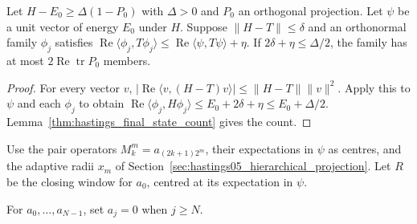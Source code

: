 \begin{lemma}
    \label{thm:hastings05_physical_gap_count}
    \leanok
    Let $H-E_0\ge\Delta(1-P_0)$ with $\Delta>0$ and $P_0$ an orthogonal
    projection. Let $\psi$ be a unit vector of energy $E_0$ under $H$.
    Suppose $\|H-T\|\le\delta$ and an orthonormal family $\phi_j$ satisfies
    $\operatorname{Re}\langle\phi_j,T\phi_j\rangle
        \le\operatorname{Re}\langle\psi,T\psi\rangle+\eta$.
    If $2\delta+\eta\le\Delta/2$, the family has at most
    $2\operatorname{Re}\operatorname{tr}P_0$ members.
\end{lemma}
\begin{proof}\leanok
    For every vector $v$,
    $|\operatorname{Re}\langle v,(H-T)v\rangle|
        \le\|H-T\|\|v\|^2$. Apply this to $\psi$ and each $\phi_j$ to obtain
    $\operatorname{Re}\langle\phi_j,H\phi_j\rangle
        \le E_0+2\delta+\eta\le E_0+\Delta/2$.
    Lemma~\ref{thm:hastings_final_state_count} gives the count.
\end{proof}

\begin{definition}
    \label{def:hastings05_periodic_projection}
    \leanok
    Use the pair operators $M_k^m=a_{(2k+1)2^m}$, their expectations in
    $\psi$ as centres, and the adaptive radii $x_m$ of
    Section~\ref{sec:hastings05_hierarchical_projection}. Let $R$ be the
    closing window for $a_0$, centred at its expectation in $\psi$.
\end{definition}

\begin{definition}
    \label{def:hastings05_finite_edges}
    \leanok
    For $a_0,\ldots,a_{N-1}$, set $a_j=0$ when $j\ge N$.
\end{definition}

